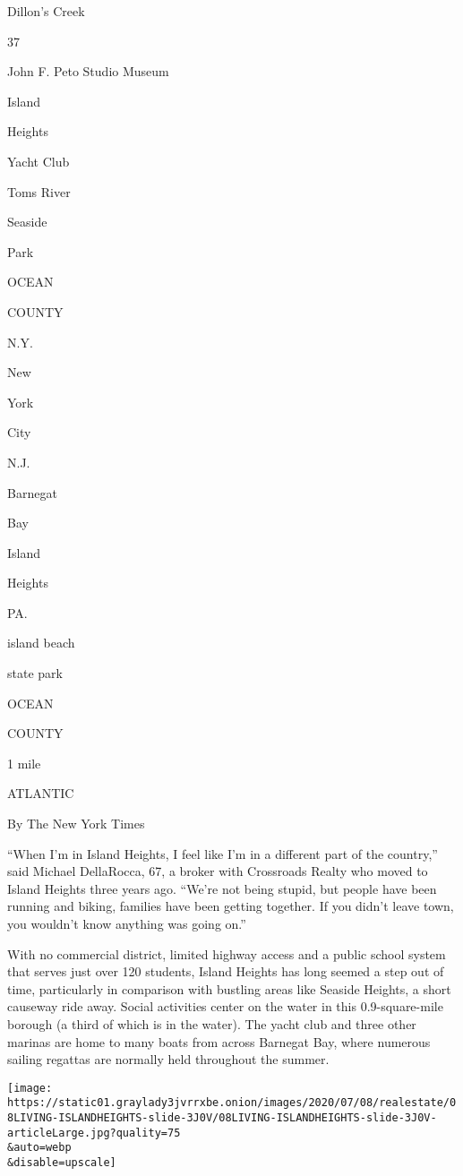 Dillon's Creek

37

John F. Peto Studio Museum

Island

Heights

Yacht Club

Toms River

Seaside

Park

OCEAN

COUNTY

N.Y.

New

York

City

N.J.

Barnegat

Bay

Island

Heights

PA.

island beach

state park

OCEAN

COUNTY

1 mile

ATLANTIC

By The New York Times

``When I'm in Island Heights, I feel like I'm in a different part of the
country,'' said Michael DellaRocca, 67, a broker with Crossroads Realty
who moved to Island Heights three years ago. ``We're not being stupid,
but people have been running and biking, families have been getting
together. If you didn't leave town, you wouldn't know anything was going
on.''

With no commercial district, limited highway access and a public school
system that serves just over 120 students, Island Heights has long
seemed a step out of time, particularly in comparison with bustling
areas like Seaside Heights, a short causeway ride away. Social
activities center on the water in this 0.9-square-mile borough (a third
of which is in the water). The yacht club and three other marinas are
home to many boats from across Barnegat Bay, where numerous sailing
regattas are normally held throughout the summer.

\texttt{[image: https://static01.graylady3jvrrxbe.onion/images/2020/07/08/realestate/08LIVING-ISLANDHEIGHTS-slide-3J0V/08LIVING-ISLANDHEIGHTS-slide-3J0V-articleLarge.jpg?quality=75\\\&auto=webp\\\&disable=upscale]}

